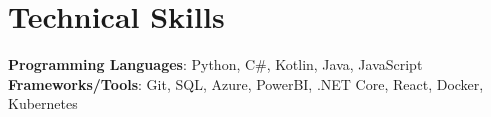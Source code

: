 \section{Technical Skills}
 \begin{itemize}[leftmargin=0.15in, label={}]
    \small{\item{
      \textbf{Programming Languages}{: Python, C\#, Kotlin, Java, JavaScript } \\
     \textbf{Frameworks/Tools}{: Git, SQL, Azure, PowerBI, .NET Core, React, Docker, Kubernetes }\\
    }}
 \end{itemize}